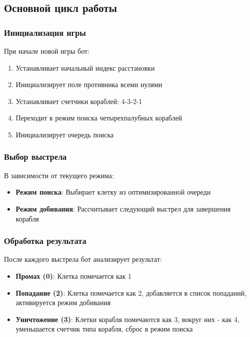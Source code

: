 \documentclass[oneside,a4paper,14pt]{extarticle}
\begin{document}
\subsection*{Основной цикл работы}

\subsubsection*{Инициализация игры}

При начале новой игры бот:
\begin{enumerate}
  \item Устанавливает начальный индекс расстановки
  \item Инициализирует поле противника всеми нулями
  \item Устанавливает счетчики кораблей: 4-3-2-1
  \item Переходит в режим поиска четырехпалубных кораблей
  \item Инициализирует очередь поиска
\end{enumerate}

\subsubsection*{Выбор выстрела}

В зависимости от текущего режима:
\begin{itemize}
  \item[$-$] \textbf{Режим поиска}: Выбирает клетку из оптимизированной очереди
  \item[$-$] \textbf{Режим добивания}: Рассчитывает следующий выстрел для завершения корабля
\end{itemize}

\subsubsection*{Обработка результата}

После каждого выстрела бот анализирует результат:
\begin{itemize}
  \item[$-$] \textbf{Промах (0)}: Клетка помечается как 1
  \item[$-$] \textbf{Попадание (2)}: Клетка помечается как 2, добавляется в список попаданий, активируется режим добивания
  \item[$-$] \textbf{Уничтожение (3)}: Клетки корабля помечаются как 3, вокруг них - как 4, уменьшается счетчик типа корабля, сброс в режим поиска
\end{itemize}
\end{document}
